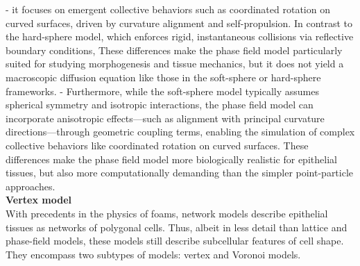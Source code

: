 - it focuses on emergent collective behaviors such as coordinated rotation on curved surfaces, driven by curvature alignment and self-propulsion. 
In contrast to the hard-sphere model, which enforces rigid, instantaneous collisions via reflective boundary conditions, 
These differences make the phase field model particularly suited for studying morphogenesis and tissue mechanics, but it does not yield a macroscopic diffusion equation like those in the soft-sphere or hard-sphere frameworks.
- Furthermore, while the soft-sphere model typically assumes spherical symmetry and isotropic interactions, the phase field model can incorporate anisotropic effects—such as alignment with principal curvature directions—through geometric coupling terms, enabling the simulation of complex collective behaviors like coordinated rotation on curved surfaces. 
These differences make the phase field model more biologically realistic for epithelial tissues, but also more computationally demanding than the simpler point-particle approaches. \\





\textbf{Vertex model} \\

With precedents in the physics of foams, network models describe epithelial tissues as networks of polygonal cells. Thus, albeit in less detail than lattice and phase-field models, these models still describe subcellular features of cell shape. They encompass two subtypes of models: vertex and Voronoi models.

